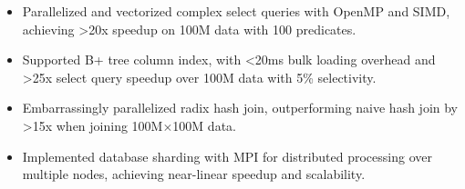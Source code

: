 


\begin{itemize}[nosep]
  \item Parallelized and vectorized complex select queries with OpenMP and SIMD, achieving >20x speedup on 100M data with 100 predicates.
  \item Supported B+ tree column index, with <20ms bulk loading overhead and >25x select query speedup over 100M data with 5\% selectivity.
  \item Embarrassingly parallelized radix hash join, outperforming naive hash join by >15x when joining 100M$\times$100M data.
  \item Implemented database sharding with MPI for distributed processing over multiple nodes, achieving near-linear speedup and scalability.
\end{itemize}
